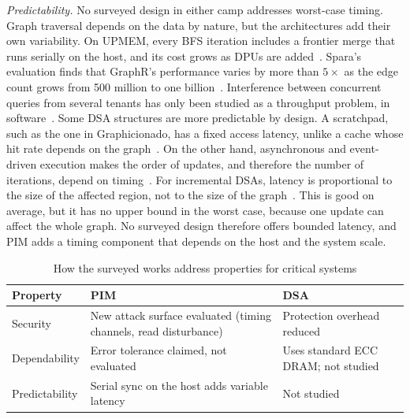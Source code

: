 \documentclass[journal,onecolumn]{IEEEtran}
\begin{document}
\emph{Predictability.} No surveyed design in either camp addresses worst-case timing. Graph traversal depends on the data by nature, but the architectures add their own variability. On UPMEM, every BFS iteration includes a frontier merge that runs serially on the host, and its cost grows as DPUs are added~\cite{gomezluna2022prim}. Spara's evaluation finds that GraphR's performance varies by more than $5\times$ as the edge count grows from 500 million to one billion~\cite{zheng2020spara}. Interference between concurrent queries from several tenants has only been studied as a throughput problem, in software~\cite{yin2023glign}. Some DSA structures are more predictable by design. A scratchpad, such as the one in Graphicionado, has a fixed access latency, unlike a cache whose hit rate depends on the graph~\cite{ham2016graphicionado}. On the other hand, asynchronous and event-driven execution makes the order of updates, and therefore the number of iterations, depend on timing~\cite{rahman2021jetstream,zhuo2019graphq}. For incremental DSAs, latency is proportional to the size of the affected region, not to the size of the graph~\cite{rahman2021jetstream,zhao2022tdgraph}. This is good on average, but it has no upper bound in the worst case, because one update can affect the whole graph. No surveyed design therefore offers bounded latency, and PIM adds a timing component that depends on the host and the system scale.

\begin{table}[t]
\caption{How the surveyed works address properties for critical systems}
\label{tab:critical}
\centering\footnotesize
\begin{tabularx}{\columnwidth}{@{}L{2.6cm}YY@{}}
\toprule
Property & PIM & DSA \\
\midrule
Security & New attack surface evaluated (timing channels, read disturbance)~\cite{bostanci2025impact,yuksel2026pid} & Protection overhead reduced~\cite{hua2022mgx} \\
Dependability & Error tolerance claimed, not evaluated~\cite{song2018graphr} & Uses standard ECC DRAM; not studied \\
Predictability & Serial sync on the host adds variable latency~\cite{gomezluna2022prim} & Not studied \\
\bottomrule
\end{tabularx}
\end{table}

\end{document}
